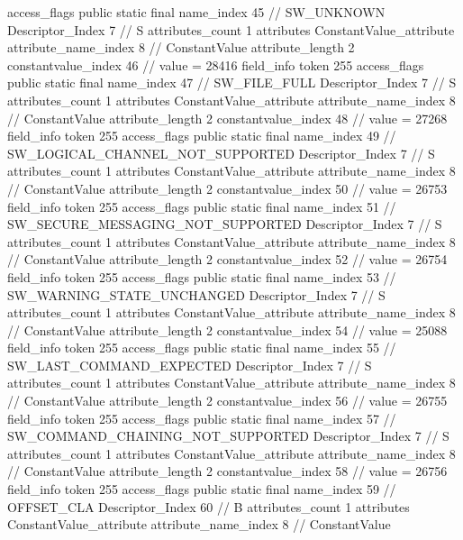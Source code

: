 {{{{{				access_flags	public static final
				name_index	45		// SW_UNKNOWN
				Descriptor_Index	7		// S
				attributes_count	1
				attributes {
				ConstantValue_attribute {
					attribute_name_index	8		// ConstantValue
					attribute_length	2
					constantvalue_index	46		// value = 28416
				}
				}
			}
			field_info {
				token	255
				access_flags	public static final
				name_index	47		// SW_FILE_FULL
				Descriptor_Index	7		// S
				attributes_count	1
				attributes {
				ConstantValue_attribute {
					attribute_name_index	8		// ConstantValue
					attribute_length	2
					constantvalue_index	48		// value = 27268
				}
				}
			}
			field_info {
				token	255
				access_flags	public static final
				name_index	49		// SW_LOGICAL_CHANNEL_NOT_SUPPORTED
				Descriptor_Index	7		// S
				attributes_count	1
				attributes {
				ConstantValue_attribute {
					attribute_name_index	8		// ConstantValue
					attribute_length	2
					constantvalue_index	50		// value = 26753
				}
				}
			}
			field_info {
				token	255
				access_flags	public static final
				name_index	51		// SW_SECURE_MESSAGING_NOT_SUPPORTED
				Descriptor_Index	7		// S
				attributes_count	1
				attributes {
				ConstantValue_attribute {
					attribute_name_index	8		// ConstantValue
					attribute_length	2
					constantvalue_index	52		// value = 26754
				}
				}
			}
			field_info {
				token	255
				access_flags	public static final
				name_index	53		// SW_WARNING_STATE_UNCHANGED
				Descriptor_Index	7		// S
				attributes_count	1
				attributes {
				ConstantValue_attribute {
					attribute_name_index	8		// ConstantValue
					attribute_length	2
					constantvalue_index	54		// value = 25088
				}
				}
			}
			field_info {
				token	255
				access_flags	public static final
				name_index	55		// SW_LAST_COMMAND_EXPECTED
				Descriptor_Index	7		// S
				attributes_count	1
				attributes {
				ConstantValue_attribute {
					attribute_name_index	8		// ConstantValue
					attribute_length	2
					constantvalue_index	56		// value = 26755
				}
				}
			}
			field_info {
				token	255
				access_flags	public static final
				name_index	57		// SW_COMMAND_CHAINING_NOT_SUPPORTED
				Descriptor_Index	7		// S
				attributes_count	1
				attributes {
				ConstantValue_attribute {
					attribute_name_index	8		// ConstantValue
					attribute_length	2
					constantvalue_index	58		// value = 26756
				}
				}
			}
			field_info {
				token	255
				access_flags	public static final
				name_index	59		// OFFSET_CLA
				Descriptor_Index	60		// B
				attributes_count	1
				attributes {
				ConstantValue_attribute {
					attribute_name_index	8		// ConstantValue
}}}}}}}
